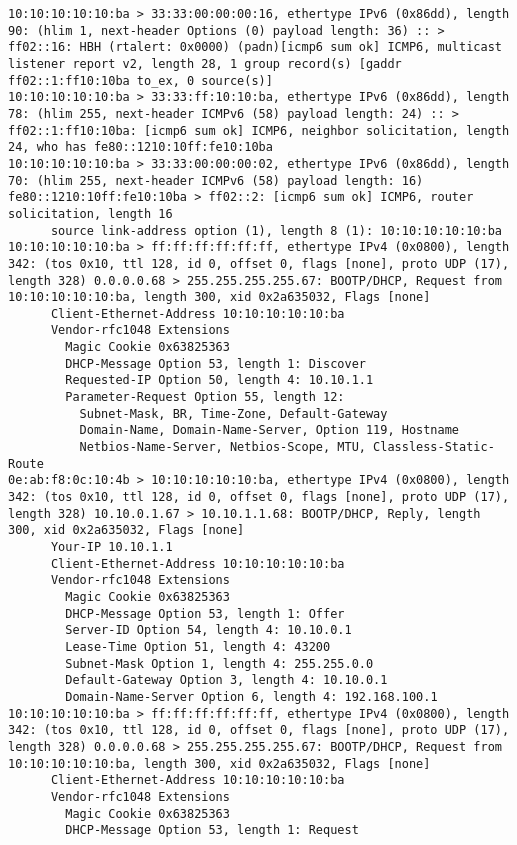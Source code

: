 \documentclass[a4paper,12pt]{article}
\begin{document}
\begin{Verbatim}
10:10:10:10:10:ba > 33:33:00:00:00:16, ethertype IPv6 (0x86dd), length 90: (hlim 1, next-header Options (0) payload length: 36) :: > ff02::16: HBH (rtalert: 0x0000) (padn)[icmp6 sum ok] ICMP6, multicast listener report v2, length 28, 1 group record(s) [gaddr ff02::1:ff10:10ba to_ex, 0 source(s)]
10:10:10:10:10:ba > 33:33:ff:10:10:ba, ethertype IPv6 (0x86dd), length 78: (hlim 255, next-header ICMPv6 (58) payload length: 24) :: > ff02::1:ff10:10ba: [icmp6 sum ok] ICMP6, neighbor solicitation, length 24, who has fe80::1210:10ff:fe10:10ba
10:10:10:10:10:ba > 33:33:00:00:00:02, ethertype IPv6 (0x86dd), length 70: (hlim 255, next-header ICMPv6 (58) payload length: 16) fe80::1210:10ff:fe10:10ba > ff02::2: [icmp6 sum ok] ICMP6, router solicitation, length 16
	  source link-address option (1), length 8 (1): 10:10:10:10:10:ba
10:10:10:10:10:ba > ff:ff:ff:ff:ff:ff, ethertype IPv4 (0x0800), length 342: (tos 0x10, ttl 128, id 0, offset 0, flags [none], proto UDP (17), length 328) 0.0.0.0.68 > 255.255.255.255.67: BOOTP/DHCP, Request from 10:10:10:10:10:ba, length 300, xid 0x2a635032, Flags [none]
	  Client-Ethernet-Address 10:10:10:10:10:ba
	  Vendor-rfc1048 Extensions
	    Magic Cookie 0x63825363
	    DHCP-Message Option 53, length 1: Discover
	    Requested-IP Option 50, length 4: 10.10.1.1
	    Parameter-Request Option 55, length 12: 
	      Subnet-Mask, BR, Time-Zone, Default-Gateway
	      Domain-Name, Domain-Name-Server, Option 119, Hostname
	      Netbios-Name-Server, Netbios-Scope, MTU, Classless-Static-Route
0e:ab:f8:0c:10:4b > 10:10:10:10:10:ba, ethertype IPv4 (0x0800), length 342: (tos 0x10, ttl 128, id 0, offset 0, flags [none], proto UDP (17), length 328) 10.10.0.1.67 > 10.10.1.1.68: BOOTP/DHCP, Reply, length 300, xid 0x2a635032, Flags [none]
	  Your-IP 10.10.1.1
	  Client-Ethernet-Address 10:10:10:10:10:ba
	  Vendor-rfc1048 Extensions
	    Magic Cookie 0x63825363
	    DHCP-Message Option 53, length 1: Offer
	    Server-ID Option 54, length 4: 10.10.0.1
	    Lease-Time Option 51, length 4: 43200
	    Subnet-Mask Option 1, length 4: 255.255.0.0
	    Default-Gateway Option 3, length 4: 10.10.0.1
	    Domain-Name-Server Option 6, length 4: 192.168.100.1
10:10:10:10:10:ba > ff:ff:ff:ff:ff:ff, ethertype IPv4 (0x0800), length 342: (tos 0x10, ttl 128, id 0, offset 0, flags [none], proto UDP (17), length 328) 0.0.0.0.68 > 255.255.255.255.67: BOOTP/DHCP, Request from 10:10:10:10:10:ba, length 300, xid 0x2a635032, Flags [none]
	  Client-Ethernet-Address 10:10:10:10:10:ba
	  Vendor-rfc1048 Extensions
	    Magic Cookie 0x63825363
	    DHCP-Message Option 53, length 1: Request

\end{Verbatim}
\end{document}
